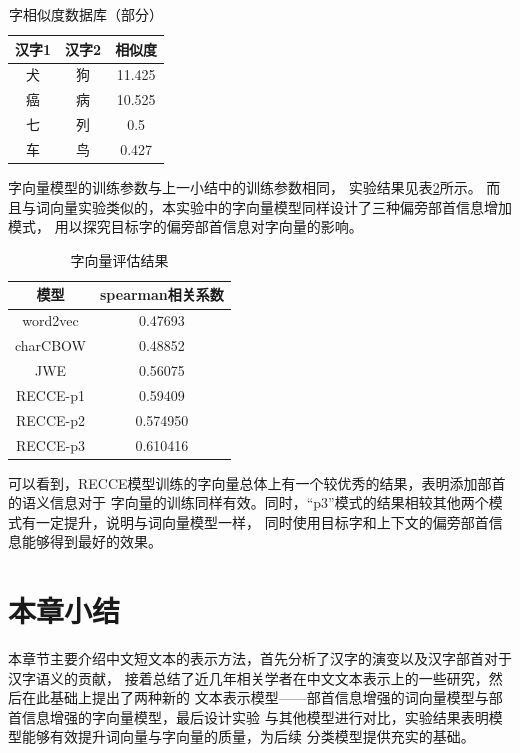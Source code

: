 \begin{table}[h]
    \caption{字相似度数据库（部分）}
    \begin{tabular}{|c|c|c|}
        \hline
        汉字1 & 汉字2 & 相似度 \\
        \hline
        犬 & 狗 & 11.425 \\
        \hline
        癌 & 病 & 10.525 \\
        \hline
        七 & 列 & 0.5 \\
        \hline
        车 & 鸟 & 0.427 \\
        \hline
    \end{tabular}
    \label{charsim_form}
    \end{table}
字向量模型的训练参数与上一小结中的训练参数相同，
实验结果见表\ref{char_vec_result}所示。
而且与词向量实验类似的，本实验中的字向量模型同样设计了三种偏旁部首信息增加模式，
用以探究目标字的偏旁部首信息对字向量的影响。
\begin{table}[!h]
    \caption{字向量评估结果}
    \begin{tabular}{|c|c|}
        \hline
        模型 &  spearman相关系数\\
        \hline
        word2vec & 0.47693 \\
        \hline
        charCBOW & 0.48852 \\
        \hline
        JWE & 0.56075 \\
        \hline
        RECCE-p1 & 0.59409 \\
        \hline
        RECCE-p2 & 0.574950 \\
        \hline
        RECCE-p3 & 0.610416 \\
        \hline
    \end{tabular}
    \label{char_vec_result}
    \end{table}

可以看到，RECCE模型训练的字向量总体上有一个较优秀的结果，表明添加部首的语义信息对于
字向量的训练同样有效。同时，“p3”模式的结果相较其他两个模式有一定提升，说明与词向量模型一样，
同时使用目标字和上下文的偏旁部首信息能够得到最好的效果。
\section{本章小结}
本章节主要介绍中文短文本的表示方法，首先分析了汉字的演变以及汉字部首对于汉字语义的贡献，
接着总结了近几年相关学者在中文文本表示上的一些研究，然后在此基础上提出了两种新的
文本表示模型——部首信息增强的词向量模型与部首信息增强的字向量模型，最后设计实验
与其他模型进行对比，实验结果表明模型能够有效提升词向量与字向量的质量，为后续
分类模型提供充实的基础。